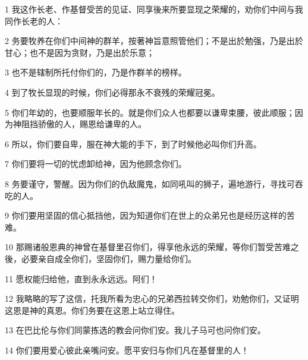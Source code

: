 \par 1 我这作长老、作基督受苦的见证、同享後来所要显现之荣耀的，劝你们中间与我同作长老的人：
\par 2 务要牧养在你们中间神的群羊，按著神旨意照管他们；不是出於勉强，乃是出於甘心；也不是因为贪财，乃是出於乐意；
\par 3 也不是辖制所托付你们的，乃是作群羊的榜样。
\par 4 到了牧长显现的时候，你们必得那永不衰残的荣耀冠冕。
\par 5 你们年幼的，也要顺服年长的。就是你们众人也都要以谦卑束腰，彼此顺服；因为神阻挡骄傲的人，赐恩给谦卑的人。
\par 6 所以，你们要自卑，服在神大能的手下，到了时候他必叫你们升高。
\par 7 你们要将一切的忧虑卸给神，因为他顾念你们。
\par 8 务要谨守，警醒。因为你们的仇敌魔鬼，如同吼叫的狮子，遍地游行，寻找可吞吃的人。
\par 9 你们要用坚固的信心抵挡他，因为知道你们在世上的众弟兄也是经历这样的苦难。
\par 10 那赐诸般恩典的神曾在基督里召你们，得享他永远的荣耀，等你们暂受苦难之後，必要亲自成全你们，坚固你们，赐力量给你们。
\par 11 愿权能归给他，直到永永远远。阿们！
\par 12 我略略的写了这信，托我所看为忠心的兄弟西拉转交你们，劝勉你们，又证明这恩是神的真恩。你们务要在这恩上站立得住。
\par 13 在巴比伦与你们同蒙拣选的教会问你们安。我儿子马可也问你们安。
\par 14 你们要用爱心彼此亲嘴问安。愿平安归与你们凡在基督里的人！


